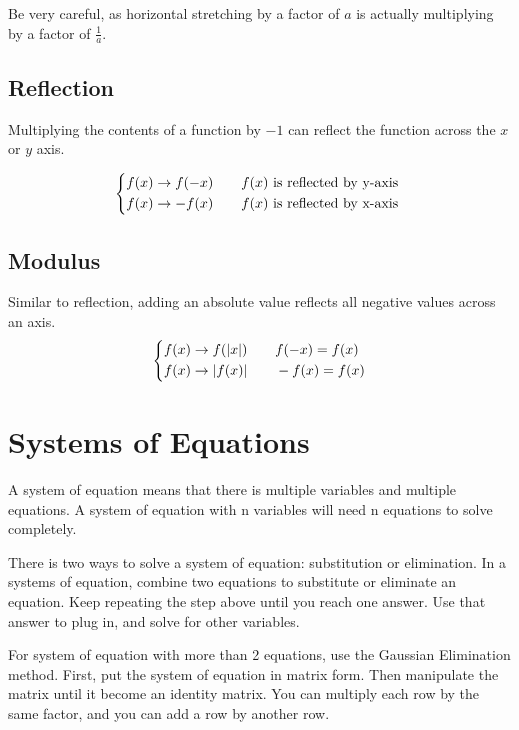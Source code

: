 \documentclass[../notes.tex]{subfiles}
\begin{document}
Be very careful, as horizontal stretching by a factor of $a$ is actually multiplying by a factor of $\frac{1}{a}$.

\subsection{Reflection}
Multiplying the contents of a function by $-1$ can reflect the function across the $x$ or $y$ axis.

\begin{equation}
	\begin{dcases}
		f(x) \rightarrow f(-x) \qquad f(x) \textrm{ is reflected by y-axis } \\
		f(x) \rightarrow -f(x) \qquad f(x) \textrm{ is reflected by x-axis }
	\end{dcases}
\end{equation}

\subsection{Modulus}
Similar to reflection, adding an absolute value reflects all negative values across an axis.
\begin{equation}
	\begin{dcases}
		f(x) \rightarrow f(|x|) \qquad f(-x) = f(x) \\
		f(x) \rightarrow |f(x)| \qquad -f(x) = f(x)
	\end{dcases}
\end{equation}

\section{Systems of Equations}
A system of equation means that there is multiple variables and multiple equations.
A system of equation with n variables will need n equations to solve completely.

There is two ways to solve a system of equation: substitution or elimination.
In a systems of equation, combine two equations to substitute or eliminate an equation.
Keep repeating the step above until you reach one answer.
Use that answer to plug in, and solve for other variables.

For system of equation with more than 2 equations, use the Gaussian Elimination method.
First, put the system of equation in matrix form.
Then manipulate the matrix until it become an identity matrix.
You can multiply each row by the same factor, and you can add a row by another row.
\end{document}
